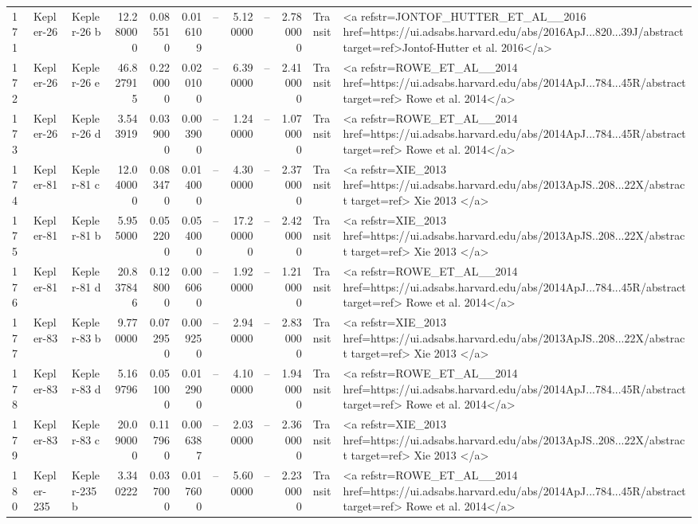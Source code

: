 \begin{tabular}{lllrrrrrrrll}
171 & Kepler-26 & Kepler-26 b & 12.280000 & 0.085510 & 0.016109 & -- & 5.120000 & -- & 2.780000 & Transit & <a refstr=JONTOF_HUTTER_ET_AL__2016 href=https://ui.adsabs.harvard.edu/abs/2016ApJ...820...39J/abstract target=ref>Jontof-Hutter et al. 2016</a> \\
172 & Kepler-26 & Kepler-26 e & 46.827915 & 0.220000 & 0.020100 & -- & 6.390000 & -- & 2.410000 & Transit & <a refstr=ROWE_ET_AL__2014 href=https://ui.adsabs.harvard.edu/abs/2014ApJ...784...45R/abstract target=ref> Rowe et al. 2014</a> \\
173 & Kepler-26 & Kepler-26 d & 3.543919 & 0.039000 & 0.003900 & -- & 1.240000 & -- & 1.070000 & Transit & <a refstr=ROWE_ET_AL__2014 href=https://ui.adsabs.harvard.edu/abs/2014ApJ...784...45R/abstract target=ref> Rowe et al. 2014</a> \\
174 & Kepler-81 & Kepler-81 c & 12.040000 & 0.083470 & 0.014000 & -- & 4.300000 & -- & 2.370000 & Transit & <a refstr=XIE_2013 href=https://ui.adsabs.harvard.edu/abs/2013ApJS..208...22X/abstract target=ref> Xie 2013 </a> \\
175 & Kepler-81 & Kepler-81 b & 5.955000 & 0.052200 & 0.054000 & -- & 17.200000 & -- & 2.420000 & Transit & <a refstr=XIE_2013 href=https://ui.adsabs.harvard.edu/abs/2013ApJS..208...22X/abstract target=ref> Xie 2013 </a> \\
176 & Kepler-81 & Kepler-81 d & 20.837846 & 0.128000 & 0.006060 & -- & 1.920000 & -- & 1.210000 & Transit & <a refstr=ROWE_ET_AL__2014 href=https://ui.adsabs.harvard.edu/abs/2014ApJ...784...45R/abstract target=ref> Rowe et al. 2014</a> \\
177 & Kepler-83 & Kepler-83 b & 9.770000 & 0.072950 & 0.009250 & -- & 2.940000 & -- & 2.830000 & Transit & <a refstr=XIE_2013 href=https://ui.adsabs.harvard.edu/abs/2013ApJS..208...22X/abstract target=ref> Xie 2013 </a> \\
178 & Kepler-83 & Kepler-83 d & 5.169796 & 0.051000 & 0.012900 & -- & 4.100000 & -- & 1.940000 & Transit & <a refstr=ROWE_ET_AL__2014 href=https://ui.adsabs.harvard.edu/abs/2014ApJ...784...45R/abstract target=ref> Rowe et al. 2014</a> \\
179 & Kepler-83 & Kepler-83 c & 20.090000 & 0.117960 & 0.006387 & -- & 2.030000 & -- & 2.360000 & Transit & <a refstr=XIE_2013 href=https://ui.adsabs.harvard.edu/abs/2013ApJS..208...22X/abstract target=ref> Xie 2013 </a> \\
180 & Kepler-235 & Kepler-235 b & 3.340222 & 0.037000 & 0.017600 & -- & 5.600000 & -- & 2.230000 & Transit & <a refstr=ROWE_ET_AL__2014 href=https://ui.adsabs.harvard.edu/abs/2014ApJ...784...45R/abstract target=ref> Rowe et al. 2014</a> \\

\end{tabular}
